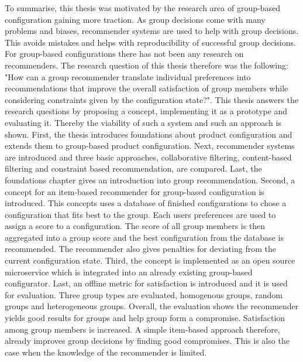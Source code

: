 To summarise, this thesis was motivated by the research area of group-based configuration gaining more traction. As group decisions come with many problems and biases, recommender systems are used  to help with group decisions. This avoids mistakes and helps with reproducibility of successful group decisions. For group-based configurations there has not been any research on recommenders. The research question of this thesis therefore was the following: "How can a group recommender translate individual preferences into recommendations that improve the overall satisfaction of group members while considering constraints given by the configuration state?". This thesis answers the research questions by proposing a concept, implementing it as a prototype and evaluating it. Thereby the viability of such a system and such an approach is shown.
First, the thesis introduces foundations about product configuration and extends them to group-based product configuration. Next, recommender systems are introduced and three basic approaches, collaborative filtering, content-based filtering and constraint based recommendation, are compared. Last, the foundations chapter gives an introduction into group recommendation.
Second, a concept for an item-based recommender for group-based configuration is introduced. This concepts uses a database of finished configurations to chose a configuration that fits best to the group. Each users preferences are used to assign a score to a configuration. The score of all group members is then aggregated into a group score and the best configuration from the database is recommended. The recommender also gives penalties for deviating from the current configuration state.
Third, the concept is implemented as an open source microservice which is integrated into an already existing group-based configurator.
Last, an offline metric for satisfaction is introduced and it is used for evaluation. Three group types are evaluated, homogenous groups, random groups and heterogeneous groups. Overall, the evaluation shows the recommender yields good results for groups and help group form a compromise. Satisfaction among group members is increased. A simple item-based approach therefore,  already improves group decisions by finding good compromises. This is also the case when the knowledge of the recommender is limited.



